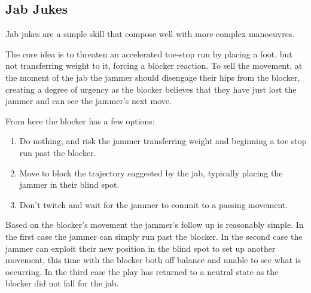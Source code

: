\subsection{Jab Jukes}
\label{skill:jab_jukes}

Jab jukes are a simple skill that compose well with more complex manoeuvres. 

The core idea is to threaten an accelerated toe-stop run by placing a foot, but not transferring weight to it, forcing a blocker reaction.  
To sell the movement, at the moment of the jab the jammer should disengage their hips from the blocker, creating a degree of urgency as the blocker believes that they have just lost the jammer and can see the jammer's next move.


From here the blocker has a few options:

\begin{enumerate}
\item Do nothing, and risk the jammer transferring weight and beginning a toe stop run past the blocker.  
\item Move to block the trajectory suggested by the jab, typically placing the jammer in their blind spot. 
\item Don't twitch and wait for the jammer to commit to a passing movement.
\end{enumerate}

Based on the blocker's movement the jammer's follow up is reasonably simple. 
In the first case the jammer can simply run past the blocker. 
In the second case the jammer can exploit their new position in the blind spot to set up another movement, this time with the blocker both off balance and unable to see what is occurring.
In the third case the play has returned to a neutral state as the blocker did not fall for the jab.
